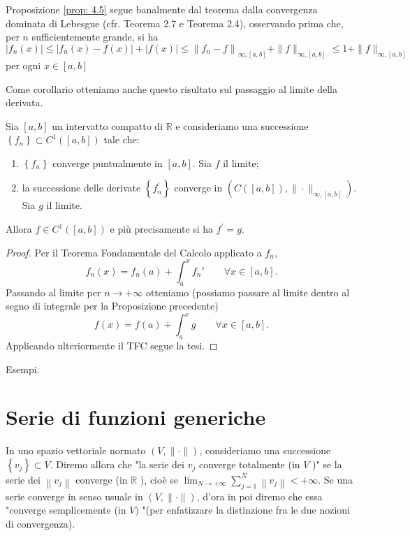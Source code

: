 \begin{oss}
    Proposizione \ref{prop: 4.5} segue banalmente dal teorema dalla convergenza dominata di Lebesgue (cfr. Teorema 2.7 e Teorema 2.4), osservando prima che, per $n$ sufficientemente grande, si ha
    \[\left|f_{n}(x)\right| \leq\left|f_{n}(x)-f(x)\right|+|f(x)| \leq\left\|f_{n}-f\right\|_{\infty,[a, b]}+\|f\|_{\infty,[a, b]} \leq 1+\|f\|_{\infty,[a, b]}\]
    per ogni $x \in[a, b]$
\end{oss} 

Come corollario otteniamo anche questo risultato sul passaggio al limite della derivata.

\begin{corollary}[$*$]\label{cor: 4.1}
    Sia $[a, b]$ un intervatto compatto di $\mathbb{R}$ e consideriamo una successione $\left\{f_{n}\right\} \subset C^{1}([a, b])$ tale che:
    \begin{enumerate}[i]
        \item $\left\{f_{n}\right\}$ converge puntualmente in $[a, b]$. Sia $f$ il limite;
        \item la successione delle derivate $\left\{f_{n}^{\prime}\right\}$ converge in $\left(C([a, b]),\|\cdot\|_{\infty,[a, b]}\right)$. Sia $g$ il limite.
    \end{enumerate}
    Allora $f \in C^{1}([a, b])$ e più precisamente si ha $f^{\prime}=g$.
\end{corollary}
\begin{proof}
    Per il Teorema Fondamentale del Calcolo applicato a ${f_n}$, 
    \[f_n(x) = f_n(a)+\int_a^xf_n'\qquad \forall x \in [a,b].\]
    Passando al limite per $n\to +\infty$ otteniamo (possiamo passare al limite dentro al segno di integrale per la Proposizione precedente)
    \[f(x) = f(a)+\int_a^xg\qquad \forall x \in [a,b].\]
    Applicando ulteriormente il TFC segue la tesi.
\end{proof}
Esempi.

\section{Serie di funzioni generiche}
\begin{boxdef}
    In uno spazio vettoriale normato $(V,\|\cdot\|)$, consideriamo una successione $\left\{v_{j}\right\} \subset V$. Diremo allora che "la serie dei $v_{j}$ converge totalmente (in $V$ )" se la serie dei $\left\|v_{j}\right\|$ converge (in $\mathbb{R}$ ), cioè se $\lim _{N \rightarrow+\infty} \sum_{j=1}^{N}\left\|v_{j}\right\|<+\infty$. Se una serie converge in senso usuale in $(V,\|\cdot\|)$, d'ora in poi diremo che essa "converge semplicemente (in $V)$ "(per enfatizzare la distinzione fra le due nozioni di convergenza).
\end{boxdef}

